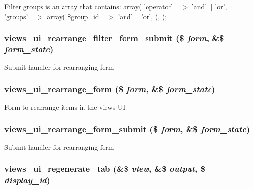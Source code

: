 Filter groups is an array that contains: array( 'operator' =$>$ 'and' $|$$|$ 'or', 'groups' =$>$ array( \$group\_\-id =$>$ 'and' $|$$|$ 'or', ), );\hypertarget{admin_8inc_a6738d9e2d6b0bc17b8c07791a000c961}{
\subsubsection[{views\_\-ui\_\-rearrange\_\-filter\_\-form\_\-submit}]{\setlength{\rightskip}{0pt plus 5cm}views\_\-ui\_\-rearrange\_\-filter\_\-form\_\-submit (\$ {\em form}, \/  \&\$ {\em form\_\-state})}}
\label{admin_8inc_a6738d9e2d6b0bc17b8c07791a000c961}
Submit handler for rearranging form \hypertarget{admin_8inc_a9f3001cf0f6d1faa6c3dd6b36482fb29}{
\subsubsection[{views\_\-ui\_\-rearrange\_\-form}]{\setlength{\rightskip}{0pt plus 5cm}views\_\-ui\_\-rearrange\_\-form (\$ {\em form}, \/  \&\$ {\em form\_\-state})}}
\label{admin_8inc_a9f3001cf0f6d1faa6c3dd6b36482fb29}
Form to rearrange items in the views UI. \hypertarget{admin_8inc_a6cc534f5a5904b1b21333fb063836be7}{
\subsubsection[{views\_\-ui\_\-rearrange\_\-form\_\-submit}]{\setlength{\rightskip}{0pt plus 5cm}views\_\-ui\_\-rearrange\_\-form\_\-submit (\$ {\em form}, \/  \&\$ {\em form\_\-state})}}
\label{admin_8inc_a6cc534f5a5904b1b21333fb063836be7}
Submit handler for rearranging form \hypertarget{admin_8inc_a0c7f4e9787916976d7dab26c969f2cea}{
\subsubsection[{views\_\-ui\_\-regenerate\_\-tab}]{\setlength{\rightskip}{0pt plus 5cm}views\_\-ui\_\-regenerate\_\-tab (\&\$ {\em view}, \/  \&\$ {\em output}, \/  \$ {\em display\_\-id})}}
